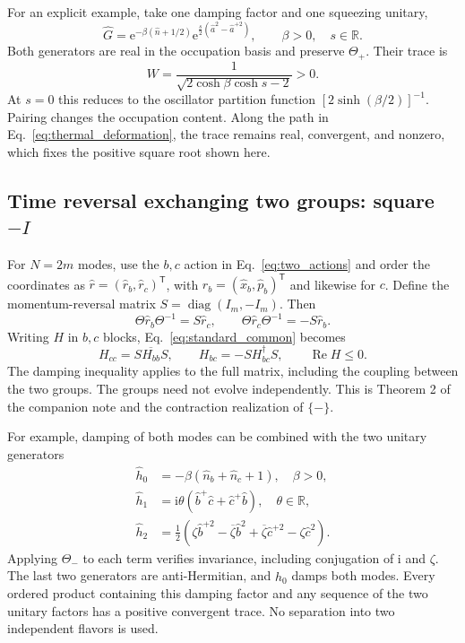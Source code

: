 \documentclass[11pt,a4paper]{article}
\newcommand{\diag}{\operatorname{diag}}
\newcommand{\ee}{\mathrm e}
\newcommand{\ii}{\mathrm i}
\newcommand{\trans}{\mathsf T}
\numberwithin{equation}{section}
\begin{document}
For an explicit example, take one damping factor and one squeezing unitary,
\begin{equation}
 \hat G=\ee^{-\beta(\hat n+1/2)}
 \ee^{\frac{s}{2}(\hat a^2-\hat a^{+2})},
 \qquad \beta>0,\quad s\in\mathbb R.
 \label{eq:plus_example}
\end{equation}
Both generators are real in the occupation basis and preserve $\Theta_+$.
Their trace is
\begin{equation}
 W=\frac{1}{\sqrt{2\cosh\beta\cosh s-2}}>0.
 \label{eq:plus_example_trace}
\end{equation}
At $s=0$ this reduces to the oscillator partition function
$[2\sinh(\beta/2)]^{-1}$. Pairing changes the occupation content.
Along the path in Eq.~\eqref{eq:thermal_deformation}, the trace remains real, convergent,
and nonzero, which fixes the positive square root shown here.

\subsection{Time reversal exchanging two groups: square \texorpdfstring{$-I$}{-I}}

For $N=2m$ modes, use the $b,c$ action in Eq.~\eqref{eq:two_actions} and
order the coordinates as $\hat r=(\hat r_b,\hat r_c)^\trans$, with
$\hat r_b=(\hat x_b,\hat p_b)^\trans$ and likewise for $c$. Define the
momentum-reversal matrix $S=\diag(I_m,-I_m)$. Then
\begin{equation}
 \Theta\hat r_b\Theta^{-1}=S\hat r_c,\qquad
 \Theta\hat r_c\Theta^{-1}=-S\hat r_b.
\end{equation}
Writing $H$ in $b,c$ blocks, Eq.~\eqref{eq:standard_common} becomes
\begin{equation}
 \boxed{H_{cc}=S\overline{H_{bb}}S,\qquad
 H_{bc}=-S H_{bc}^\dagger S,\qquad
 \operatorname{Re}H\leq0.}
 \label{eq:minus_standard}
\end{equation}
The damping inequality applies to the full matrix, including the coupling
between the two groups. The groups need not evolve independently. This is
Theorem 2 of the companion note and the contraction realization of $\{-\}$.

For example, damping of both modes can be combined with the two unitary
generators
\begin{align}
 \hat h_0&=-\beta(\hat n_b+\hat n_c+1),\quad\beta>0,\nonumber\\
 \hat h_1&=\ii\theta(\hat b^+\hat c+\hat c^+\hat b),
 \quad\theta\in\mathbb R,\nonumber\\
 \hat h_2&=\frac12\left(
 \zeta\hat b^{+2}-\overline\zeta\hat b^2
 +\overline\zeta\hat c^{+2}-\zeta\hat c^2\right).
 \label{eq:minus_example}
\end{align}
Applying $\Theta_-$ to each term verifies invariance, including conjugation
of $\ii$ and $\zeta$. The last two generators are anti-Hermitian, and
$\hat h_0$ damps both modes. Every ordered product containing this damping
factor and any sequence of the two unitary factors has a positive convergent
trace. No separation into two independent flavors is used.
\end{document}
